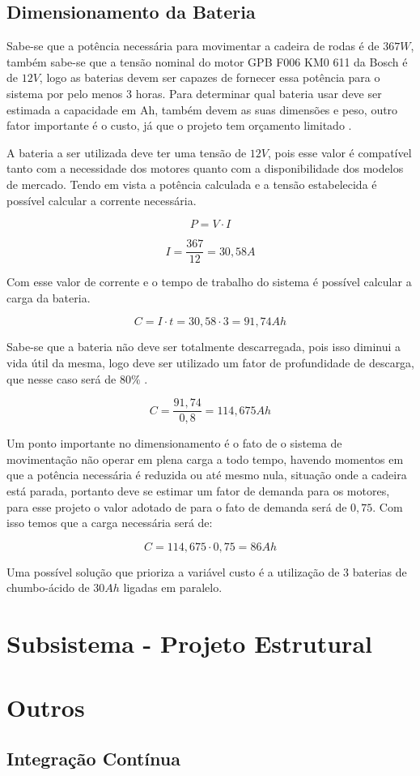 \subsection{Dimensionamento da Bateria}

Sabe-se que a potência necessária para movimentar a cadeira de rodas é de $367 W$,
também sabe-se que a tensão nominal do motor GPB F006 KM0 611 da Bosch é de $12V$,
logo as baterias devem ser capazes de fornecer essa potência para o sistema por
pelo menos 3 horas. Para determinar qual bateria usar deve ser estimada a
capacidade em Ah, também devem as suas dimensões e peso, outro fator importante
é o custo, já que o projeto tem orçamento limitado \cite{costa}.

A bateria a ser utilizada deve ter uma tensão de $12V$, pois esse valor é
compatível tanto com a necessidade dos motores quanto com a disponibilidade dos
modelos de mercado. Tendo em vista a potência calculada e a tensão estabelecida
é possível calcular a corrente necessária.

\begin{equation}
P = V \cdot I
\end{equation}

\begin{equation}
I = \frac{367}{12} = 30,58 A
\end{equation}

Com esse valor de corrente e o tempo de trabalho do sistema é possível calcular
a carga da bateria.

\begin{equation}
C = I \cdot t = 30,58 \cdot 3 = 91,74 Ah
\end{equation}

Sabe-se que a bateria não deve ser totalmente descarregada, pois isso diminui a
vida útil da mesma, logo deve ser utilizado um fator de profundidade de descarga,
que nesse caso será de $80\%$ \cite{KARASINSKI}.

\begin{equation}
C = \frac{91,74}{0,8} = 114,675 Ah
\end{equation}

Um ponto importante no dimensionamento é o fato de o sistema de movimentação não
operar em plena carga a todo tempo, havendo momentos em que a potência necessária
é reduzida ou até mesmo nula, situação onde a cadeira está parada, portanto deve
se estimar um fator de demanda para os motores, para esse projeto o valor
adotado de para o fato de demanda será de $0,75$. Com isso temos que a carga
necessária será de:

\begin{equation}
C = 114,675 \cdot 0,75 = 86Ah
\end{equation}

Uma possível solução que prioriza a variável custo é a utilização de $3$ baterias
de chumbo-ácido de $30 Ah$ ligadas em paralelo.

\section{Subsistema - Projeto Estrutural}

\section{Outros}

\subsection{Integração Contínua}
